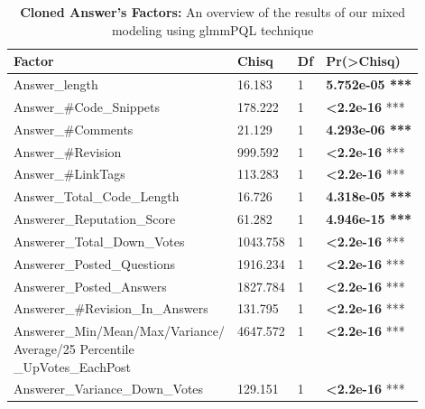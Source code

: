 \documentclass[conference]{IEEEtran}
\begin{document}
	\begin{table}[ht]
	\caption{\textbf{Cloned Answer's Factors:} An overview of the results of our mixed modeling using \textnormal{glmmPQL} technique}
	\centering
	\begin{tabular}{l l l l}
		\hline\hline
		Factor & Chisq & Df & Pr(\textgreater Chisq) \\ [0.5ex]
		\hline
		Answer\_length         &               16.183 &  1 &  \textbf{5.752e-05 ***} \\
		Answer\_\#Code\_Snippets    &         178.222 & 1 & \textbf{\textless 2.2e-16} *** \\
		Answer\_\#Comments         &         21.129 & 1 & \textbf{4.293e-06 ***} \\
		Answer\_\#Revision    &       999.592 & 1 & \textbf{\textless 2.2e-16} *** \\
		Answer\_\#LinkTags            &         113.283 & 1 & \textbf{\textless 2.2e-16} *** \\
		Answer\_Total\_Code\_Length        &       16.726&  1 & \textbf{4.318e-05 ***} \\
		Answerer\_Reputation\_Score   &     61.282 & 1  & \textbf{4.946e-15 ***} \\
		Answerer\_Total\_Down\_Votes      &      1043.758 & 1  & \textbf{\textless 2.2e-16} *** \\
		Answerer\_Posted\_Questions   &   1916.234 & 1 & \textbf{\textless 2.2e-16} *** \\
		Answerer\_Posted\_Answers    &    1827.784 & 1 & \textbf{\textless 2.2e-16} *** \\
		Answerer\_\#Revision\_In\_Answers & 131.795 & 1 &  \textbf{\textless 2.2e-16} *** \\
		\makecell{Answerer\_Min/Mean/Max/Variance/\\Average/25 Percentile\\\_UpVotes\_EachPost }      &      4647.572 & 1  & \textbf{\textless 2.2e-16} *** \\
		Answerer\_Variance\_Down\_Votes    &  129.151 & 1&  \textbf{\textless 2.2e-16} *** \\[1ex]
		\hline
	\end{tabular}
	\label{table:RQTwoResutls}
\end{table}
\end{document}
